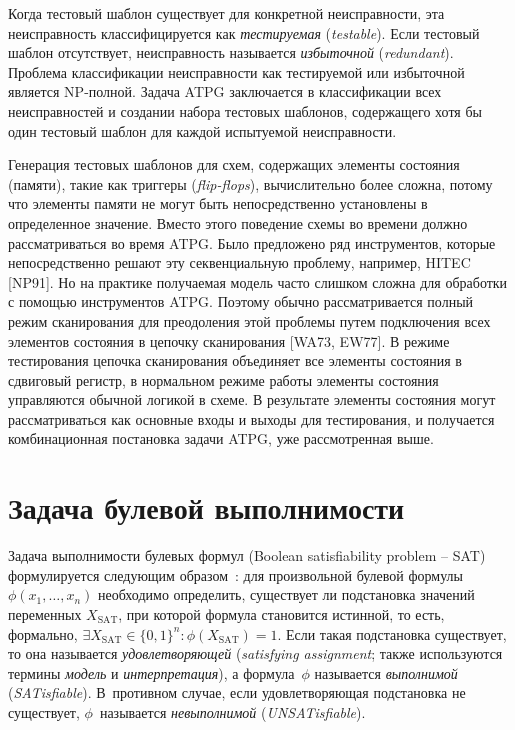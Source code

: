 Когда тестовый шаблон существует для конкретной неисправности, эта неисправность классифицируется как \textit{тестируемая} (\textit{testable}).
Если тестовый шаблон отсутствует, неисправность называется \textit{избыточной} (\textit{redundant}).
Проблема классификации неисправности как тестируемой или избыточной является NP-полной.
Задача ATPG заключается в классификации всех неисправностей и создании набора тестовых шаблонов, содержащего хотя бы один тестовый шаблон для каждой испытуемой неисправности.


Генерация тестовых шаблонов для схем, содержащих элементы состояния (памяти), такие как триггеры (\textit{flip-flops}), вычислительно более сложна, потому что элементы памяти не могут быть непосредственно установлены в определенное значение.
Вместо этого поведение схемы во времени должно рассматриваться во время ATPG.
Было предложено ряд инструментов, которые непосредственно решают эту секвенциальную проблему, например, HITEC [NP91].
Но на практике получаемая модель часто слишком сложна для обработки с помощью инструментов ATPG.
Поэтому обычно рассматривается полный режим сканирования для преодоления этой проблемы путем подключения всех элементов состояния в цепочку сканирования [WA73, EW77].
В режиме тестирования цепочка сканирования объединяет все элементы состояния в сдвиговый регистр, в нормальном режиме работы элементы состояния управляются обычной логикой в схеме.
В результате элементы состояния могут рассматриваться как основные входы и выходы для тестирования, и получается комбинационная постановка задачи ATPG, уже рассмотренная выше.




\section{Задача булевой выполнимости}
\label{sec:sat}

Задача выполнимости булевых формул (Boolean satisfiability problem \--- SAT) формулируется следующим образом~\cite{handbook-sat}: для произвольной булевой формулы~$\phi(x_1, \dotsc, x_n)$ необходимо определить, существует ли подстановка значений переменных $X_\text{SAT}$, при которой формула становится истинной, то есть, формально, $\exists X_\text{SAT} \in \{0,1\}^n : \phi(X_\text{SAT}) = 1$.
Если такая подстановка существует, то она называется \textit{удовлетворяющей} (\textit{satisfying assignment}; также используются термины \textit{модель} и \textit{интерпретация}), а формула~$\phi$ называется \textit{выполнимой} (\textit{SATisfiable}).
В~противном случае, если удовлетворяющая подстановка не существует, $\phi$~называется \textit{невыполнимой} (\textit{UNSATisfiable}).

